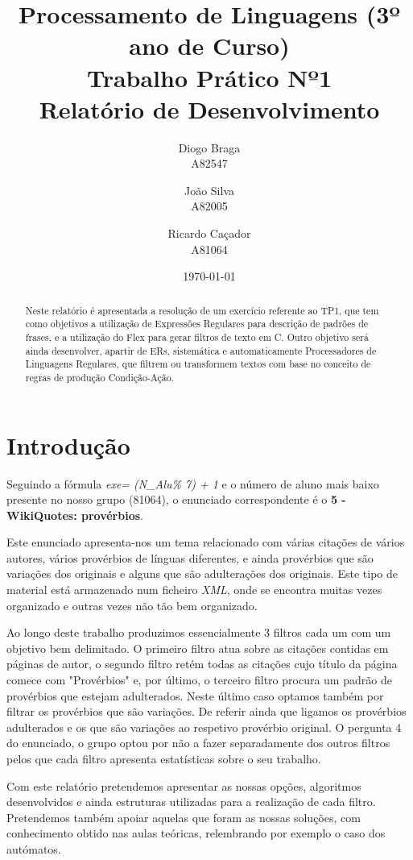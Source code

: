 \documentclass[11pt,a4paper]{report}
\title{Processamento de Linguagens (3º ano de Curso)\\
	\textbf{Trabalho Prático Nº1}\\ Relatório de Desenvolvimento}
\author{Diogo Braga\\ A82547 \and João Silva\\ A82005 \and Ricardo Caçador\\ A81064}
\date{\today}
\begin{document}
\maketitle

\begin{abstract}
	Neste relatório é apresentada a resolução de um exercício referente ao TP1, que tem como objetivos a utilização de Expressões Regulares para descrição de padrões de frases, e a utilização do Flex para gerar filtros de texto em C.
Outro objetivo será ainda desenvolver, apartir de ERs, sistemática e automaticamente Processadores de Linguagens Regulares, que filtrem ou transformem textos com base no conceito de regras de produção Condição-Ação.
\end{abstract}

\tableofcontents

\newpage

\chapter{Introdução}
\label{chap:intro}

Seguindo a fórmula \emph{exe= (N\_Alu\% 7) + 1} e o número de aluno mais baixo presente no nosso grupo (81064), o enunciado correspondente é o \textbf{5 - WikiQuotes: provérbios}.

Este enunciado apresenta-nos um tema relacionado com várias citações de vários autores, vários provérbios de línguas diferentes, e ainda provérbios que são variações dos originais e alguns que são adulterações dos originais. Este tipo de material está armazenado num ficheiro \emph{XML}, onde se encontra muitas vezes organizado e outras vezes não tão bem organizado.

Ao longo deste trabalho produzimos essencialmente 3 filtros cada um com um objetivo bem delimitado. O primeiro filtro atua sobre as citações contidas em páginas de autor, o segundo filtro retém todas as citações cujo título da página comece com "Provérbios" e, por último, o terceiro filtro procura um padrão de provérbios que estejam adulterados. Neste último caso optamos também por filtrar os provérbios que são variações. De referir ainda que ligamos os provérbios adulterados e os que são variações ao respetivo provérbio original. O pergunta 4 do enunciado, o grupo optou por não a fazer separadamente dos outros filtros pelos que cada filtro apresenta estatísticas sobre o seu trabalho.

Com este relatório pretendemos apresentar as nossas opções, algoritmos desenvolvidos e ainda estruturas utilizadas para a realização de cada filtro. Pretendemos também apoiar aquelas que foram as nossas soluções, com conhecimento obtido nas aulas teóricas, relembrando por exemplo o caso dos autómatos.
\end{document}
